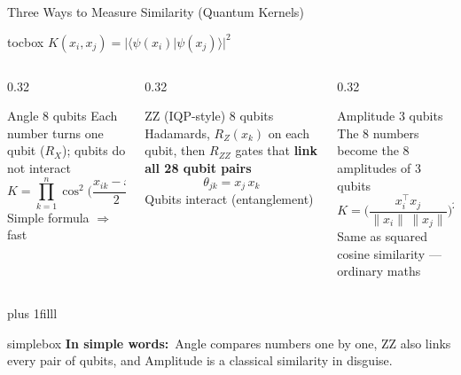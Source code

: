 \documentclass[aspectratio=169,11pt,t,xcolor={table}]{beamer}
\newcommand{\insimple}[1]{%
  \par\vskip 0pt plus 1filll
  \begin{beamercolorbox}[wd=\textwidth,sep=4pt,rounded=true]{simplebox}%
    \small\textbf{\textcolor{qamber!75!black}{In simple words:}}\ #1%
  \end{beamercolorbox}\vskip1pt}
\begin{document}
\begin{frame}{Three Ways to Measure Similarity (Quantum Kernels)}
  \centering
  \begin{beamercolorbox}[wd=0.78\textwidth,sep=4pt,rounded=true,center]{tocbox}
    $K(x_i,x_j)=|\langle\psi(x_i)|\psi(x_j)\rangle|^2$ 
  \end{beamercolorbox}
  \vspace{3mm}
  \begin{columns}[T,onlytextwidth]
    \begin{column}{0.32\textwidth}
      \begin{block}{Angle \hfill 8 qubits}
        \footnotesize
        Each number turns one qubit ($R_X$); qubits do not interact
        \[K=\prod_{k=1}^{n}\cos^2\!\Big(\frac{x_{ik}-x_{jk}}{2}\Big)\]
        Simple formula $\Rightarrow$ fast
      \end{block}
    \end{column}
    \begin{column}{0.32\textwidth}
      \begin{block}{ZZ (IQP-style) \hfill 8 qubits}
        \footnotesize
        Hadamards, $R_Z(x_k)$ on each qubit, then $R_{ZZ}$ gates that \textbf{link all 28 qubit pairs}
        \[\theta_{jk}=x_j\,x_k\]
        Qubits interact (entanglement)
      \end{block}
    \end{column}
    \begin{column}{0.32\textwidth}
      \begin{block}{Amplitude \hfill 3 qubits}
        \footnotesize
        The 8 numbers become the 8 amplitudes of 3 qubits
        \[K=\Big(\frac{x_i^{\top}x_j}{\|x_i\|\,\|x_j\|}\Big)^{2}\]
        Same as squared cosine similarity --- ordinary maths
      \end{block}
    \end{column}
  \end{columns}
  \insimple{Angle compares numbers one by one, ZZ also links every pair of qubits, and Amplitude is a classical similarity in disguise.}
\end{frame}
\end{document}
